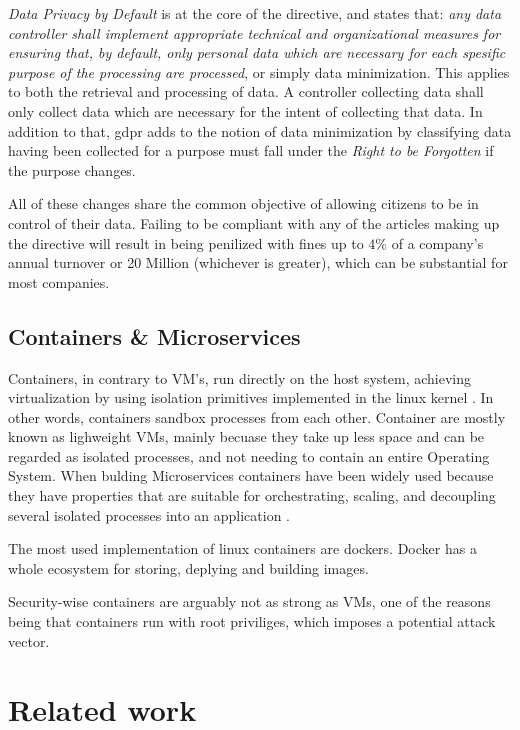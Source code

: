 \documentclass[USenglish]{uit-thesis}
\begin{document}
\textit{Data Privacy by Default} is at the core of the directive, and states
that: \textit{any data controller shall implement appropriate technical and organizational
measures for ensuring that, by default, only personal data which are necessary for each spesific
purpose of the processing are processed}, or simply data minimization.
This applies to both the retrieval and processing of data.
A controller collecting data shall only collect data which are necessary for the intent
of collecting that data.
In addition to that, \gls{gdpr} adds to the notion of data minimization by classifying
data having been collected for a purpose must fall under the \textit{Right to be Forgotten}
if the purpose changes.

All of these changes share the common objective of allowing citizens to
be in control of their data.
Failing to be compliant with any of the articles making up the
directive will result in being penilized with fines up to $ 4\% $ of a company's annual turnover
or 20 Million (whichever is greater), which can be substantial for most companies.
\section{Containers \& Microservices}
Containers, in contrary to VM's, run directly on the host system, achieving virtualization
by using isolation primitives implemented in the linux kernel \cite{Soltesz:2007:COS:1272998.1273025, 7095802}.
In other words, containers sandbox processes from each other.
Container are mostly known as lighweight VMs, mainly becuase they take up less space
and can be regarded as isolated processes, and not needing to contain an entire Operating System.
When bulding Microservices containers have been widely used because they have properties
that are suitable for orchestrating, scaling, and decoupling several isolated processes into an application \cite{micro1}.

The most used implementation of linux containers are dockers.
Docker has a whole ecosystem for storing, deplying and building images.

Security-wise containers are arguably not as strong as VMs, one of the reasons being
that containers run with root priviliges, which imposes a potential attack vector.




\chapter{Related work}
\end{document}
